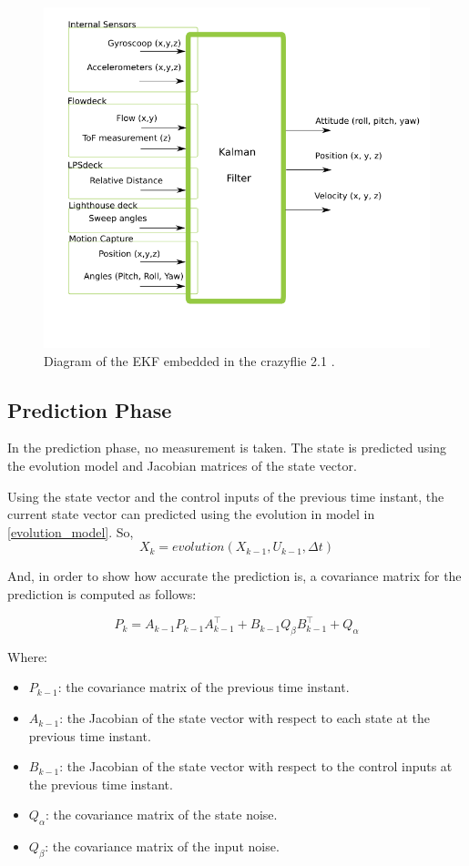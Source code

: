 \documentclass{thesisreport}
\begin{document}
\begin{figure}[h]
	\centering
	\includegraphics[width=.5\textwidth]{Images/ekf/extended_kalman_filter.png}
	\caption{Diagram of the EKF embedded in the crazyflie 2.1 \cite{EKF_bitcraze}.}
	\label{ekf_diagram_crazyflie}
\end{figure}

\newpage

	\subsection{Prediction Phase}
	In the prediction phase, no measurement is taken. The state is predicted using the evolution model and Jacobian matrices of the state vector.
	
Using the state vector and the control inputs of the previous time instant, the current state vector can predicted using the evolution in model in \ref{evolution_model}. So,
    \begin{equation}
        X_k = evolution(X_{k-1}, U_{k-1},\Delta t)
    \end{equation}

And, in order to show how accurate the prediction is, a covariance matrix for the prediction is computed as follows:

    \begin{equation}
        P_k = A_{k-1} P_{k-1} A_{k-1}^{\intercal} + B_{k-1} Q_{\beta} B_{k-1}^{\intercal} + Q_{\alpha}
    \end{equation}

Where: 

\begin{itemize}
	\item $P_{k-1}$: the covariance matrix of the previous time instant.
	\item $A_{k-1}$: the Jacobian of the state vector with respect to each state at the previous time instant.
	\item $B_{k-1}$: the Jacobian of the state vector with respect to the control inputs at the previous time instant.
	\item $Q_{\alpha}$: the covariance matrix of the state noise.
	\item $Q_{\beta}$: the covariance matrix of the input noise.
\end{itemize}	
\end{document}

